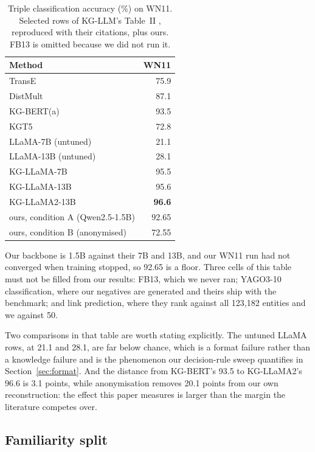 \documentclass[conference]{IEEEtran}
\begin{document}
\begin{table}[t]
\caption{Triple classification accuracy (\%) on WN11. Selected rows of
KG-LLM's Table~II \cite{kgllm}, reproduced with their citations, plus ours.
FB13 is omitted because we did not run it.}
\label{tab:kgllm}
\centering
\footnotesize
\begin{tabular}{@{}lr@{}}
\toprule
\textbf{Method} & \textbf{WN11} \\
\midrule
TransE \cite{transe}              & 75.9 \\
DistMult \cite{kgllm}             & 87.1 \\
KG-BERT(a) \cite{kgbert}          & 93.5 \\
KGT5 \cite{kgllm}                 & 72.8 \\
LLaMA-7B (untuned) \cite{kgllm}   & 21.1 \\
LLaMA-13B (untuned) \cite{kgllm}  & 28.1 \\
KG-LLaMA-7B \cite{kgllm}          & 95.5 \\
KG-LLaMA-13B \cite{kgllm}         & 95.6 \\
KG-LLaMA2-13B \cite{kgllm}        & \textbf{96.6} \\
\midrule
ours, condition A (Qwen2.5-1.5B)  & 92.65 \\
ours, condition B (anonymised)    & 72.55 \\
\bottomrule
\end{tabular}

\vspace{2pt}
{\footnotesize Our backbone is 1.5B against their 7B and 13B, and our WN11 run
had not converged when training stopped, so 92.65 is a floor. Three cells of
this table must not be filled from our results: FB13, which we never ran;
YAGO3-10 classification, where our negatives are generated and theirs ship with
the benchmark; and link prediction, where they rank against all 123{,}182
entities and we against 50.}
\end{table}

Two comparisons in that table are worth stating explicitly. The untuned LLaMA
rows, at 21.1 and 28.1, are far below chance, which is a format failure rather
than a knowledge failure and is the phenomenon our decision-rule sweep
quantifies in Section~\ref{sec:format}. And the distance from KG-BERT's 93.5 to
KG-LLaMA2's 96.6 is 3.1 points, while anonymisation removes 20.1 points from
our own reconstruction: the effect this paper measures is larger than the
margin the literature competes over.

\subsection{Familiarity split}
\end{document}
